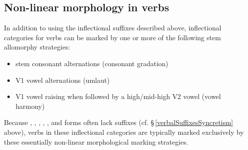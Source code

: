 \subsection{Non-linear morphology in verbs}\label{nonLinearMorphVerbs}
In addition to using the inflectional suffixes described above, inflectional categories for verbs can be marked %
by one or more of the following stem allomorphy strategies: %
\begin{itemize}
\item{stem consonant alternations (consonant gradation)}
\item{V1 vowel alternations (umlaut)}
\item{V1 vowel raising when followed by a high/mid-high V2 vowel (vowel harmony)}
\end{itemize}
Because , , , , ,  and  forms often lack suffixes (cf. §\,\ref{verbalSuffixesSyncretism} above), verbs in these inflectional categories are typically marked exclusively by these essentially non-linear morphological marking strategies. 

